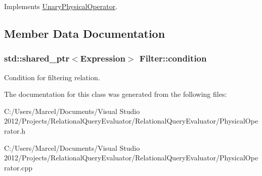 Implements \hyperlink{class_unary_physical_operator_a3b0160d380149213561ef2ba479dbf6a}{Unary\+Physical\+Operator}.



\subsection{Member Data Documentation}
\hypertarget{class_filter_acc551fc888d4b2e9bc36364a3877dbb8}{
\subsubsection[{condition}]{\setlength{\rightskip}{0pt plus 5cm}std\+::shared\+\_\+ptr$<${\bf Expression}$>$ Filter\+::condition}}\label{class_filter_acc551fc888d4b2e9bc36364a3877dbb8}
Condition for filtering relation. 

The documentation for this class was generated from the following files\+:\begin{DoxyCompactItemize}
\item 
C\+:/\+Users/\+Marcel/\+Documents/\+Visual Studio 2012/\+Projects/\+Relational\+Query\+Evaluator/\+Relational\+Query\+Evaluator/Physical\+Operator.\+h\item 
C\+:/\+Users/\+Marcel/\+Documents/\+Visual Studio 2012/\+Projects/\+Relational\+Query\+Evaluator/\+Relational\+Query\+Evaluator/Physical\+Operator.\+cpp\end{DoxyCompactItemize}
